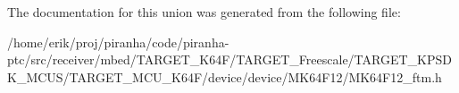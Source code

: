 The documentation for this union was generated from the following file\+:\begin{DoxyCompactItemize}
\item 
/home/erik/proj/piranha/code/piranha-\/ptc/src/receiver/mbed/\+T\+A\+R\+G\+E\+T\+\_\+\+K64\+F/\+T\+A\+R\+G\+E\+T\+\_\+\+Freescale/\+T\+A\+R\+G\+E\+T\+\_\+\+K\+P\+S\+D\+K\+\_\+\+M\+C\+U\+S/\+T\+A\+R\+G\+E\+T\+\_\+\+M\+C\+U\+\_\+\+K64\+F/device/device/\+M\+K64\+F12/M\+K64\+F12\+\_\+ftm.\+h\end{DoxyCompactItemize}
